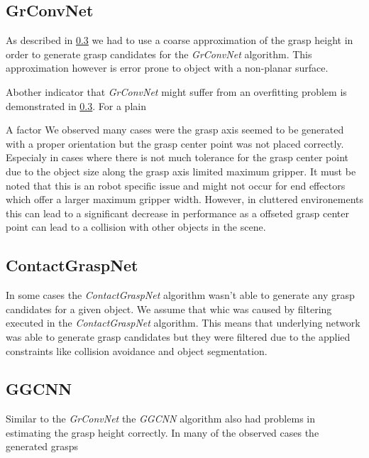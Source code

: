 \subsection{GrConvNet}
As described in \ref{} we had to use a coarse approximation of the grasp height in order to generate grasp candidates for the \textit{GrConvNet} algorithm.
This approximation however is error prone to object with a non-planar surface.

Abother indicator that \textit{GrConvNet} might suffer from an overfitting problem is demonstrated in \ref{}.
For a plain

A factor
We observed many cases were the grasp axis seemed to be generated with a proper orientation but the grasp center point was not placed correctly.
Especialy in cases where there is not much tolerance for the grasp center point due to the object size along the grasp axis limited maximum gripper.
It must be noted that this is an robot specific issue and might not occur for end effectors which offer a larger maximum gripper width.
However, in cluttered environements this can lead to a significant decrease in performance as a offseted grasp center point can lead to a collision
with other objects in the scene.

\subsection{ContactGraspNet}
In some cases the \textit{ContactGraspNet} algorithm wasn't able to generate any grasp candidates for a given object.
We assume that whic was caused by filtering executed in the \textit{ContactGraspNet} algorithm.
This means that underlying network was able to generate grasp candidates but they were filtered due to the applied constraints like collision avoidance
and object segmentation.


\subsection{GGCNN}
Similar to the \textit{GrConvNet} the \textit{GGCNN} algorithm also had problems in estimating the grasp height correctly.
In many of the observed cases the generated grasps